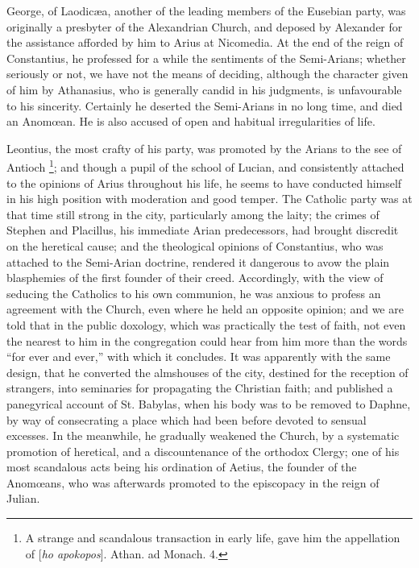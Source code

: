 George, of Laodicæa, another of the leading members of the
Eusebian party, was originally a presbyter of the Alexandrian Church,
and deposed by Alexander for the assistance afforded by him to Arius
at Nicomedia. At the end of the reign of Constantius, he professed for
a while the sentiments of the Semi-Arians; whether seriously or not,
we have not the means of deciding, although the character given
of him by Athanasius, who is generally candid in his judgments, is
unfavourable to his sincerity. Certainly he deserted the Semi-Arians
in no long time, and died an Anomœan. He is also accused of open and
habitual irregularities of life.

Leontius, the most crafty of his party, was promoted by the Arians
to the see of Antioch \footnote{A strange and scandalous transaction in
early life, gave him the appellation of [\emph{ho apokopos}]. Athan.
ad Monach. 4.};
and though a pupil of the school of Lucian, and consistently attached
to the opinions of Arius throughout his life, he seems to have
conducted himself in his high position with moderation and good
temper. The Catholic party was at that time still strong in the city,
particularly among the laity; the crimes of Stephen and Placillus, his
immediate Arian predecessors, had brought discredit on the heretical
cause; and the theological opinions of Constantius, who was attached
to the Semi-Arian doctrine, rendered it dangerous to avow the plain
blasphemies of the first founder of their creed. Accordingly, with the
view of seducing the Catholics to his own communion, he was anxious to
profess an agreement with the Church, even where he held an opposite
opinion; and we are told that in the public doxology, which was
practically the test of faith, not even the nearest to him in the
congregation could hear from him more than the words ``for ever
and ever,'' with which it concludes. It was apparently with the
same design, that he converted the almshouses of the city, destined
for the reception of strangers, into seminaries for propagating the
Christian faith; and published a panegyrical account of St.
Babylas, when his body was to be removed to Daphne, by way of
consecrating a place which had been before devoted to sensual
excesses. In the meanwhile, he gradually weakened the Church, by a
systematic promotion of heretical, and a discountenance of the
orthodox Clergy; one of his most scandalous acts being his ordination
of Aetius, the founder of the Anomœans, who was afterwards promoted
to the episcopacy in the reign of Julian.

